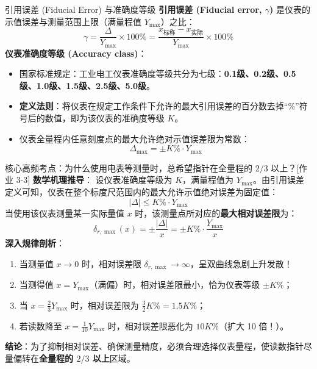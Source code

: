 \documentclass[11pt,a4paper]{ctexart}
\begin{document}
\begin{defbox}{引用误差 (Fiducial Error) 与准确度等级}
\textbf{引用误差 (Fiducial error, $\gamma$)} 是仪表的示值误差与测量范围上限（满量程值 $Y_{\max}$）之比：
\begin{equation}
    \gamma = \frac{\Delta}{Y_{\max}} \times 100\% = \frac{x_{\text{标称}} - x_{\text{实际}}}{Y_{\max}} \times 100\%
\end{equation}
\textbf{仪表准确度等级 (Accuracy class)}：
\begin{itemize}
    \item 国家标准规定：工业电工仪表准确度等级共分为七级：\textbf{0.1级、0.2级、0.5级、1.0级、1.5级、2.5级、5.0级}。
    \item \textbf{定义法则}：将仪表在规定工作条件下允许的最大引用误差的百分数去掉“$\%$”符号后的数值，即为该仪表的准确度等级 $K$。
    \item 仪表全量程内任意刻度点的最大允许绝对示值误差限为常数：
    \begin{equation}
        \Delta_{\max} = \pm K\% \cdot Y_{\max}
    \end{equation}
\end{itemize}
\end{defbox}

\begin{exambox}{核心高频考点：为什么使用电表等测量时，总希望指针在全量程的 $2/3$ 以上？[作业 3-3]}
\textbf{数学机理推导}：
设仪表准确度等级为 $K$，满量程值为 $Y_{\max}$。由引用误差定义可知，仪表在整个标度尺范围内的最大允许示值绝对误差为固定值：
\begin{equation}
    |\Delta| \le K\% \cdot Y_{\max}
\end{equation}
当使用该仪表测量某一实际量值 $x$ 时，该测量点所对应的\textbf{最大相对误差限}为：
\begin{equation}
    \delta_{r,\max}(x) = \pm \frac{|\Delta|}{x} = \pm K\% \cdot \frac{Y_{\max}}{x}
\end{equation}
\textbf{深入规律剖析}：
\begin{enumerate}
    \item 当测量值 $x \to 0$ 时，相对误差限 $\delta_{r,\max} \to \infty$，呈双曲线急剧上升发散！
    \item 当测得值 $x = Y_{\max}$（满偏）时，相对误差限最小，恰为仪表等级 $\pm K\%$；
    \item 当 $x = \frac{2}{3} Y_{\max}$ 时，相对误差限为 $\frac{3}{2} K\% = 1.5 K\%$；
    \item 若读数降至 $x = \frac{1}{10} Y_{\max}$ 时，相对误差限恶化为 $10 K\%$（扩大 10 倍！）。
\end{enumerate}
\textbf{结论}：为了抑制相对误差、确保测量精度，必须合理选择仪表量程，使读数指针尽量偏转在\textbf{全量程的 $2/3$ 以上}区域。
\end{exambox}
\end{document}
